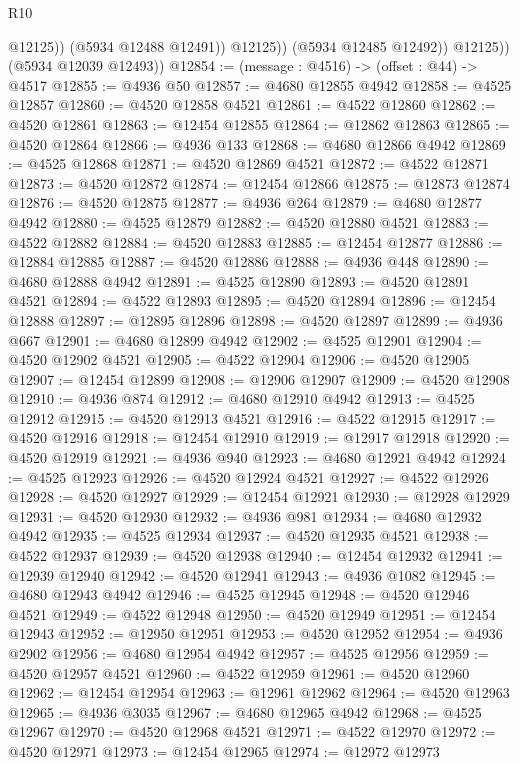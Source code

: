 \begin{lexlean}{R10}
\begin{coremodule}
                      @12125))
                  (@5934 @12488 @12491))
                @12125))
            (@5934 @12485 @12492))
          @12125))
      (@5934 @12039 @12493))
@12854 := (message : @4516) -> (offset : @44) -> @4517
@12855 := @4936 @50
@12857 := @4680 @12855 @4942
@12858 := @4525 @12857
@12860 := @4520 @12858 @4521
@12861 := @4522 @12860
@12862 := @4520 @12861
@12863 := @12454 @12855
@12864 := @12862 @12863
@12865 := @4520 @12864
@12866 := @4936 @133
@12868 := @4680 @12866 @4942
@12869 := @4525 @12868
@12871 := @4520 @12869 @4521
@12872 := @4522 @12871
@12873 := @4520 @12872
@12874 := @12454 @12866
@12875 := @12873 @12874
@12876 := @4520 @12875
@12877 := @4936 @264
@12879 := @4680 @12877 @4942
@12880 := @4525 @12879
@12882 := @4520 @12880 @4521
@12883 := @4522 @12882
@12884 := @4520 @12883
@12885 := @12454 @12877
@12886 := @12884 @12885
@12887 := @4520 @12886
@12888 := @4936 @448
@12890 := @4680 @12888 @4942
@12891 := @4525 @12890
@12893 := @4520 @12891 @4521
@12894 := @4522 @12893
@12895 := @4520 @12894
@12896 := @12454 @12888
@12897 := @12895 @12896
@12898 := @4520 @12897
@12899 := @4936 @667
@12901 := @4680 @12899 @4942
@12902 := @4525 @12901
@12904 := @4520 @12902 @4521
@12905 := @4522 @12904
@12906 := @4520 @12905
@12907 := @12454 @12899
@12908 := @12906 @12907
@12909 := @4520 @12908
@12910 := @4936 @874
@12912 := @4680 @12910 @4942
@12913 := @4525 @12912
@12915 := @4520 @12913 @4521
@12916 := @4522 @12915
@12917 := @4520 @12916
@12918 := @12454 @12910
@12919 := @12917 @12918
@12920 := @4520 @12919
@12921 := @4936 @940
@12923 := @4680 @12921 @4942
@12924 := @4525 @12923
@12926 := @4520 @12924 @4521
@12927 := @4522 @12926
@12928 := @4520 @12927
@12929 := @12454 @12921
@12930 := @12928 @12929
@12931 := @4520 @12930
@12932 := @4936 @981
@12934 := @4680 @12932 @4942
@12935 := @4525 @12934
@12937 := @4520 @12935 @4521
@12938 := @4522 @12937
@12939 := @4520 @12938
@12940 := @12454 @12932
@12941 := @12939 @12940
@12942 := @4520 @12941
@12943 := @4936 @1082
@12945 := @4680 @12943 @4942
@12946 := @4525 @12945
@12948 := @4520 @12946 @4521
@12949 := @4522 @12948
@12950 := @4520 @12949
@12951 := @12454 @12943
@12952 := @12950 @12951
@12953 := @4520 @12952
@12954 := @4936 @2902
@12956 := @4680 @12954 @4942
@12957 := @4525 @12956
@12959 := @4520 @12957 @4521
@12960 := @4522 @12959
@12961 := @4520 @12960
@12962 := @12454 @12954
@12963 := @12961 @12962
@12964 := @4520 @12963
@12965 := @4936 @3035
@12967 := @4680 @12965 @4942
@12968 := @4525 @12967
@12970 := @4520 @12968 @4521
@12971 := @4522 @12970
@12972 := @4520 @12971
@12973 := @12454 @12965
@12974 := @12972 @12973

\end{coremodule}
\end{lexlean}
